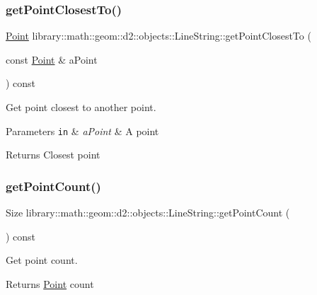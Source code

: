 \subsubsection{\texorpdfstring{get\+Point\+Closest\+To()}{getPointClosestTo()}}
{\footnotesize\ttfamily \hyperlink{classlibrary_1_1math_1_1geom_1_1d2_1_1objects_1_1_point}{Point} library\+::math\+::geom\+::d2\+::objects\+::\+Line\+String\+::get\+Point\+Closest\+To (\begin{DoxyParamCaption}\item[{const \hyperlink{classlibrary_1_1math_1_1geom_1_1d2_1_1objects_1_1_point}{Point} \&}]{a\+Point }\end{DoxyParamCaption}) const}



Get point closest to another point. 


\begin{DoxyParams}[1]{Parameters}
\mbox{\tt in}  & {\em a\+Point} & A point \\
\hline
\end{DoxyParams}
\begin{DoxyReturn}{Returns}
Closest point 
\end{DoxyReturn}
\mbox{\label{classlibrary_1_1math_1_1geom_1_1d2_1_1objects_1_1_line_string_a950ceda32b44a6f2e49c1e36bc4f4dc2}} 
\subsubsection{\texorpdfstring{get\+Point\+Count()}{getPointCount()}}
{\footnotesize\ttfamily Size library\+::math\+::geom\+::d2\+::objects\+::\+Line\+String\+::get\+Point\+Count (\begin{DoxyParamCaption}{ }\end{DoxyParamCaption}) const}



Get point count. 

\begin{DoxyReturn}{Returns}
\hyperlink{classlibrary_1_1math_1_1geom_1_1d2_1_1objects_1_1_point}{Point} count 
\end{DoxyReturn}
\mbox{\label{classlibrary_1_1math_1_1geom_1_1d2_1_1objects_1_1_line_string_a2ef4a1e387ed463286fac7c93fd7b022}} 
